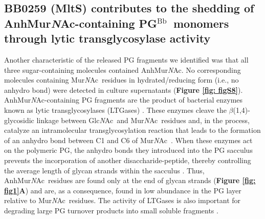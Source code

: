 \documentclass[twoside, watermark]{zHenriquesLab-StyleBioRxiv}
\newcommand{\pgbb}{PG$^\text{Bb}$}
\newcommand{\NAM}{Mur\textit{N}Ac}
\newcommand{\AnhNAM}{AnhMur\textit{N}Ac}
\newcommand{\NAG}{Glc\textit{N}Ac}
\begin{document}
\subsection*{BB0259 (MltS) contributes to the shedding of \AnhNAM-containing \pgbb~monomers through lytic transglycosylase activity}
Another characteristic of the released PG fragments we identified was that all three sugar-containing molecules contained \AnhNAM. No corresponding molecules containing \NAM~residues in hydrated/reducing form (i.e., no anhydro bond) were detected in culture supernatants (\textbf{Figure \ref{fig: figS8}}). \AnhNAM-containing PG fragments are the product of bacterial enzymes known as lytic transglycosylases (LTGases) \cite{Holtje1975}. These enzymes cleave the $\beta$(1,4)-glycosidic linkage between \NAG~and \NAM~residues and, in the process, catalyze an intramolecular transglycosylation reaction that leads to the formation of an anhydro bond between C1 and C6 of \NAM~\cite{Dik2017,Holtje1975,Kraft1998,Taylor1975}. When these enzymes act on the polymeric PG, the anhydro bonds they introduced into the PG sacculus prevents the incorporation of another disaccharide-peptide, thereby controlling the average length of glycan strands within the sacculus \cite{Bohrhunter2021,Holtje1975,Kraft1998,Sassine2021,Yunck2016}. Thus, \AnhNAM~residues are found only at the end of glycan strands (\textbf{Figure \ref{fig: fig1}A}) and are, as a consequence, found in low abundance in the PG layer relative to \NAM~residues. The activity of LTGases is also important for degrading large PG turnover products into small soluble fragments \cite{Weaver2022}. 
\end{document}
